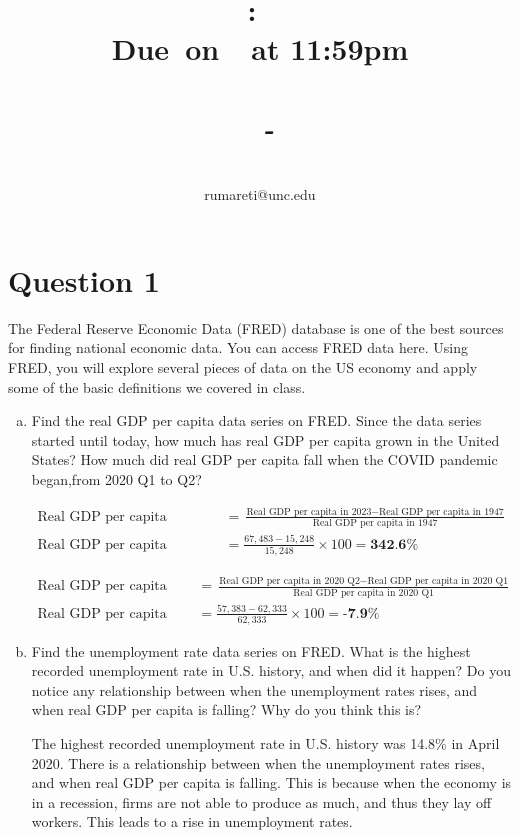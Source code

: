 \documentclass{article}
\title{
    \vspace{2in}
    \textmd{\textbf{\hmwkClass:\ \hmwkTitle}}\\
    \normalsize\vspace{0.1in}\small{\textbf{Due\ on\ \hmwkDueDate\ at 11:59pm}}\\
    \normalsize\text{Tuesday/Thursday 3:30-4:45, Genome Sciences 100}\\
    \vspace{0.1in}\large{\textit{\hmwkClassInstructor\ - \hmwkClassTime}}
    \vspace{3in}
}
\author{\hmwkAuthorName\\\small{rumareti@unc.edu}}
\date{}
\newcommand{\question}[1]{\pagebreak\section{Question #1}}
\begin{document}
\maketitle

\question{1}

The Federal Reserve Economic Data (FRED) database is one of the best sources for finding national economic data. You can access FRED data here. Using FRED, you will explore several pieces of data on the US economy and apply some of the basic definitions we covered in class.

\begin{enumerate}[(a)]
    \item Find the real GDP per capita data series on FRED. Since the data series started until today, how much has real GDP per capita
    grown in the United States? How much did real GDP per capita fall when the COVID pandemic began,from 2020 Q1 to Q2?

    \begin{align*}
        \text{Real GDP per capita growth} &= \frac{\text{Real GDP per capita in 2023} - \text{Real GDP per capita in 1947}}{\text{Real GDP per capita in 1947}} \\
        \text{Real GDP per capita growth} &= \frac{67,483 - 15,248}{15,248} \times 100 = \textbf{342.6\%}
    \end{align*}

    \begin{align*}
        \text{Real GDP per capita fall} &= \frac{\text{Real GDP per capita in 2020 Q2} - \text{Real GDP per capita in 2020 Q1}}{\text{Real GDP per capita in 2020 Q1}} \\
        \text{Real GDP per capita fall} &= \frac{57,383 - 62,333}{62,333} \times 100 = \textbf{-7.9\%}
    \end{align*}
    
    \item Find the unemployment rate data series on FRED. What is the highest recorded unemployment rate in U.S. history, and when
    did it happen? Do you notice any relationship between when the unemployment rates rises, and when real GDP per capita is falling? Why do you think this is?

    The highest recorded unemployment rate in U.S. history was 14.8\% in April 2020. There is a relationship between when the unemployment rates rises, and when real GDP per capita is falling. This is because when the economy is in a recession, firms are not able to produce as much, and thus they lay off workers. This leads to a rise in unemployment rates.


\end{enumerate}
\end{document}
